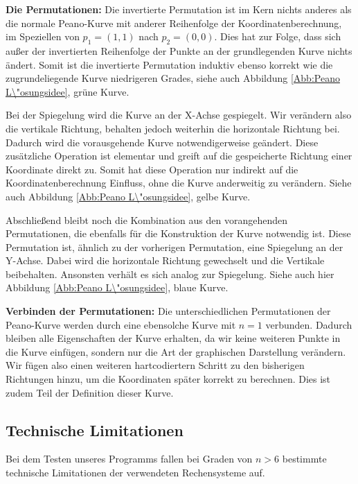 \documentclass[course=asp]{aspdoc}
\begin{document}
\textbf{Die Permutationen: }%
Die invertierte Permutation ist im Kern nichts anderes als die normale Peano-Kurve mit anderer Reihenfolge der Koordinatenberechnung, im Speziellen von $p_1=(1,1)$ nach $p_2 = (0,0)$. Dies hat zur Folge, dass sich au\ss er der invertierten Reihenfolge der Punkte an der grundlegenden Kurve nichts \"andert. Somit ist die invertierte Permutation induktiv ebenso korrekt wie die zugrundeliegende Kurve niedrigeren Grades, siehe auch Abbildung \ref{Abb:Peano L\"osungsidee}, gr\"une Kurve.

Bei der Spiegelung wird die Kurve an der X-Achse gespiegelt. Wir ver\"andern also die vertikale Richtung, behalten jedoch weiterhin die horizontale Richtung bei. Dadurch wird die vorausgehende Kurve notwendigerweise ge\"andert. Diese zus\"atzliche Operation ist elementar und greift auf die gespeicherte Richtung einer Koordinate direkt zu. Somit hat diese Operation nur indirekt auf die Koordinatenberechnung Einfluss, ohne die Kurve anderweitig zu ver\"andern. Siehe auch Abbildung \ref{Abb:Peano L\"osungsidee}, gelbe Kurve. 

Abschlie\ss end bleibt noch die Kombination aus den vorangehenden Permutationen, die ebenfalls f\"ur die Konstruktion der Kurve notwendig ist. Diese Permutation ist, \"ahnlich zu der vorherigen Permutation, eine Spiegelung an der Y-Achse. Dabei wird die horizontale Richtung gewechselt und die Vertikale beibehalten. Ansonsten verh\"alt es sich analog zur Spiegelung.
Siehe auch hier Abbildung \ref{Abb:Peano L\"osungsidee}, blaue Kurve.

\textbf{Verbinden der Permutationen: }
Die unterschiedlichen Permutationen der Peano-Kurve werden durch eine ebensolche Kurve mit $n = 1$ verbunden. Dadurch bleiben alle Eigenschaften der Kurve erhalten, da wir keine weiteren Punkte in die Kurve einf\"ugen, sondern nur die Art der graphischen Darstellung ver\"andern. Wir f\"ugen also einen weiteren hartcodiertern Schritt zu den bisherigen Richtungen hinzu, um die Koordinaten sp\"ater korrekt zu berechnen. Dies ist zudem Teil der Definition dieser Kurve.  

\subsection{Technische Limitationen} \label{Technische Limitationen} %
Bei dem Testen unseres Programms fallen bei Graden von $n > 6$ bestimmte technische Limitationen der verwendeten Rechensysteme auf. 
\end{document}
